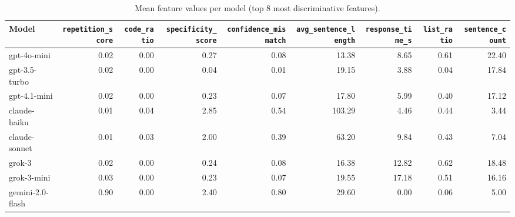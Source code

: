 \begin{table}[h]
\centering\small
\caption{Mean feature values per model (top 8 most discriminative features).}
\label{tab:fingerprints}
\begin{tabular}{lrrrrrrrr}
\toprule
\textbf{Model} & \texttt{repetition\_score} & \texttt{code\_ratio} & \texttt{specificity\_score} & \texttt{confidence\_mismatch} & \texttt{avg\_sentence\_length} & \texttt{response\_time\_s} & \texttt{list\_ratio} & \texttt{sentence\_count} \\
\midrule
gpt-4o-mini & 0.02 & 0.00 & 0.27 & 0.08 & 13.38 & 8.65 & 0.61 & 22.40 \\
gpt-3.5-turbo & 0.02 & 0.00 & 0.04 & 0.01 & 19.15 & 3.88 & 0.04 & 17.84 \\
gpt-4.1-mini & 0.02 & 0.00 & 0.23 & 0.07 & 17.80 & 5.99 & 0.40 & 17.12 \\
claude-haiku & 0.01 & 0.04 & 2.85 & 0.54 & 103.29 & 4.46 & 0.44 & 3.44 \\
claude-sonnet & 0.01 & 0.03 & 2.00 & 0.39 & 63.20 & 9.84 & 0.43 & 7.04 \\
grok-3 & 0.02 & 0.00 & 0.24 & 0.08 & 16.38 & 12.82 & 0.62 & 18.48 \\
grok-3-mini & 0.03 & 0.00 & 0.23 & 0.07 & 19.55 & 17.18 & 0.51 & 16.16 \\
gemini-2.0-flash & 0.90 & 0.00 & 2.40 & 0.80 & 29.60 & 0.00 & 0.06 & 5.00 \\
\bottomrule
\end{tabular}
\end{table}